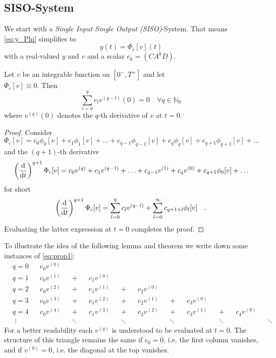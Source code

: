\subsection{SISO-System}
We start with a \textit{Single Input Single Output (SISO)}-System. That means
\eqref{eq:y_Phi} simplifies to
\begin{equation}
	y(t) = \Phi_c[v](t)
\end{equation}
with a real-valued $y$ and $v$ and a scalar $c_k=(CA^kD)$.
\begin{proposition}{}{}
	Let $v$ be an integrable function on $[0^-,T^+]$ and let \\
	$\Phi_c[v]\equiv 0$. Then
	\begin{equation}
	\sum\limits_{l=0}^q c_l v^{(q-l)}(0)=0 \quad \forall q \in \mathbb{N}_0 \tag{$\star$}
	\label{eq:prop1}
	\end{equation}
	where $v^{(q)}(0)$ denotes the $q$-th derivative of $v$ at $t=0$.
\end{proposition}
\begin{proof}
	Consider
	\begin{equation}
	\Phi_c[v] = c_0 \phi_0[v] + c_1 \phi_1[v] + \ldots + c_{q-1}\phi_{q-1}[v] + 
	c_q \phi_q[v] + c_{q+1} \phi_{q+1}[v] + \ldots 
	\end{equation}
	and the $(q+1)$-th derivative
	\begin{equation}
	\left( \frac{\text{d}}{\text{d} t} \right)^{q+1}\Phi_c[v] = c_0 v^{(q)} + c_1 v^{(q-1)} + 
	\ldots 	+ c_{q-1} v^{(1)} + c_q v^{(0)} + c_{q+1} \phi_0[v] + \ldots
	\end{equation}
	for short
	\begin{equation}
	\left( \frac{\text{d}}{\text{d} t} \right)^{q+1}\Phi_c[v] = \sum\limits_{l=0}^q c_l v^{(q-l)} 
	+\sum\limits_{l=0}^\infty c_{q+1+l} \phi_{l}[v] \quad . 
	\end{equation}
	Evaluating the latter expression at $t=0$ completes the proof.
\end{proof}

To illustrate the idea of the following lemma and theorem we write down some 
instances of \eqref{eq:prop1}: 
\begin{align*}
&q = 0& &c_0 v^{(0)} \\
&q = 1& &c_0 v^{(1)} &&+&&c_1 v^{(0)} \\
&q = 2& &c_0 v^{(2)} &&+&&c_1 v^{(1)} &&+&&c_2 v^{(0)} \\
&q = 3& &c_0 v^{(3)} &&+&&c_1 v^{(2)} &&+&&c_2 v^{(1)} && +&&c_3 v^{(0)}\\
&q = 4& &c_0 v^{(4)} &&+&&c_1 v^{(3)} &&+&&c_2 v^{(2)} && +&&c_3 v^{(1)} &&+&& c_4 
v^{(0)} \\ 
&\,\, \vdots && && \ddots && &&\ddots && &&\ddots && &&\ddots && &&\ddots 
\end{align*}
For a better readability each $v^{(q)}$ is understood to be evaluated at $t=0$. The 
structure of this triangle remains the same if $c_0=0$, i.e. the first column vanishes, 
and if $v^{(0)}=0$, i.e. the diagonal at the top vanishes. 

